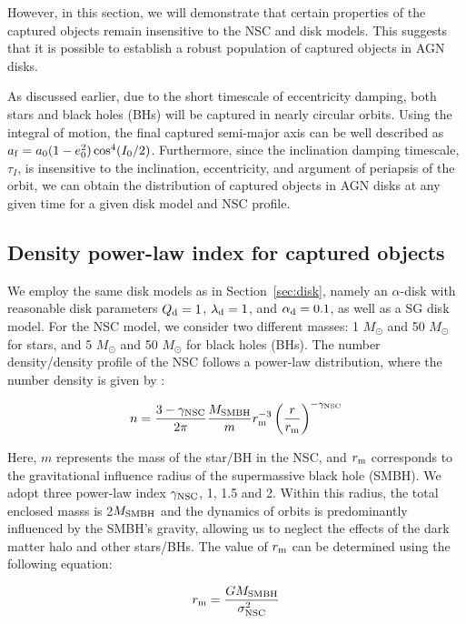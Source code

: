 \documentclass[fleqn,usenatbib]{mnras}
\begin{document}
However, in this section, we will demonstrate that certain properties of the captured objects remain insensitive to the NSC and disk models. This suggests that it is possible to establish a robust population of captured objects in AGN disks.

As discussed earlier, due to the short timescale of eccentricity damping, both stars and black holes (BHs) will be captured in nearly circular orbits. Using the integral of motion, the final captured semi-major axis can be well described as $a_{\rm f} = a_0(1-e_0^2)\cos^4(I_0/2)$. Furthermore, since the inclination damping timescale, $\tau_I$, is insensitive to the inclination, eccentricity, and argument of periapsis of the orbit, we can obtain the distribution of captured objects in AGN disks at any given time for a given disk model and NSC profile.


\subsection{Density power-law index for captured objects}
We employ the same disk models as in Section~\ref{sec:disk}, namely an $\alpha$-disk with reasonable disk parameters $Q_{\rm d}=1$, $\lambda_{\rm d}=1$, and $\alpha_{\rm d}=0.1$, as well as a SG disk model. For the NSC model, we consider two different masses: 1 $M_\odot$ and 50 $M_\odot$ for stars, and 5 $M_\odot$ and 50 $M_\odot$ for black holes (BHs). The number density/density profile of the NSC follows a power-law distribution, where the number density is given by \citep{Merritt2013}:

\begin{eqnarray}
n = \frac{3-\gamma_{\rm NSC}}{2\pi}\frac{M_{\rm SMBH}}{m}r_{\rm m}^{-3}\left(\frac{r}{r_{\rm m}}\right)^{-\gamma_{\rm NSC}}\label{eq:n-nsc}
\end{eqnarray}

Here, $m$ represents the mass of the star/BH in the NSC, and $r_{\rm m}$ corresponds to the gravitational influence radius of the supermassive black hole (SMBH). We adopt three power-law index $\gamma_{\rm NSC}$, 1, 1.5 and 2. Within this radius, the total enclosed masss is 2$M_{\rm SMBH}$ and the dynamics of orbits is predominantly influenced by the SMBH's gravity, allowing us to neglect the effects of the dark matter halo and other stars/BHs. The value of $r_{\rm m}$ can be determined using the following equation:

\begin{eqnarray}
r_{\rm m} = \frac{GM_{\rm SMBH}}{\sigma_{\rm NSC}^2}
\end{eqnarray}
\end{document}
